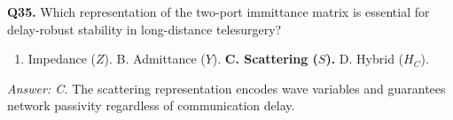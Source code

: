 \documentclass[11pt,a4paper,twoside]{report}
\begin{document}
\bigskip
\textbf{Q35.} Which representation of the two-port immittance matrix is essential for delay-robust stability in long-distance telesurgery?
\begin{enumerate}[label=\Alph*.]
    \item Impedance ($Z$). \quad B. Admittance ($Y$). \quad \textbf{C. Scattering ($S$).} \quad D. Hybrid ($H_C$).
\end{enumerate}
\textit{Answer: C.} The scattering representation encodes wave variables and guarantees network passivity regardless of communication delay.
\end{document}
